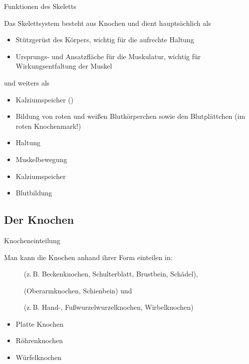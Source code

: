{Funktionen des Skeletts}
{%
Das Skelettsystem besteht aus Knochen und dient 
hauptsächlich als

\begin{itemize}
    \item Stützgerüst  des Körpers, wichtig für die aufrechte Haltung
    \item Ursprungs-  und Ansatzfläche für die Muskulatur, wichtig für
    Wirkungsentfaltung der Muskel
\end{itemize}

und weiters als

\begin{itemize}
    \item Kalziumspeicher ()
    \item Bildung von roten und weißen Blutkörperchen sowie den Blutplättchen
    (im roten Knochenmark!) 
\end{itemize}
}
{%
\begin{itemize}
  \item Haltung
  \item Muskelbewegung
  \item Kalziumspeicher
  \item Blutbildung
\end{itemize}
}
{}{}{}

\subsection{Der Knochen}

{Knocheneinteilung}
{%
Man kann die Knochen anhand ihrer Form einteilen in: 
\begin{description}
    \item[] (z.\,B. Beckenknochen,
    Schulterblatt, Brustbein, Schädel),
    \item[] (Oberarmknochen, Schienbein)
    und
    \item[] (z.\,B. Hand-, Fußwurzelwurzelknochen,
    Wirbelknochen)
\end{description}
}
{
\begin{itemize}
  \item Platte Knochen
  \item Röhrenknochen
  \item Würfelknochen
\end{itemize}
}
{}{}{}

